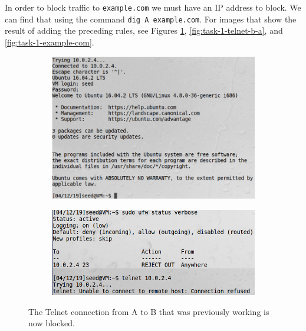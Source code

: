 \documentclass[12pt,letterpaper]{article}
\begin{document}
		In order to block traffic to \texttt{example.com} we must have an IP address to block. We can find that using the command \texttt{dig A example.com}. For images that show the result of adding the preceding rules, see Figures \ref{fig:task-1-telnet-a-b}, \ref{fig:task-1-telnet-b-a}, and \ref{fig:task-1-example-com}.
		
		\begin{figure}[p]
			\centering
			\begin{subfigure}{.5\linewidth}
				\centering
				\includegraphics[width=.95\linewidth]{task-1-a-b-telnet-working}
			\end{subfigure}%
			\begin{subfigure}{.5\linewidth}
				\centering
				\includegraphics[width=.95\linewidth]{task-1-a-b-telnet-blocked}
			\end{subfigure}
			\caption{The Telnet connection from A to B that was previously working is now blocked.}
			\label{fig:task-1-telnet-a-b}
		\end{figure}
	
\end{document}
